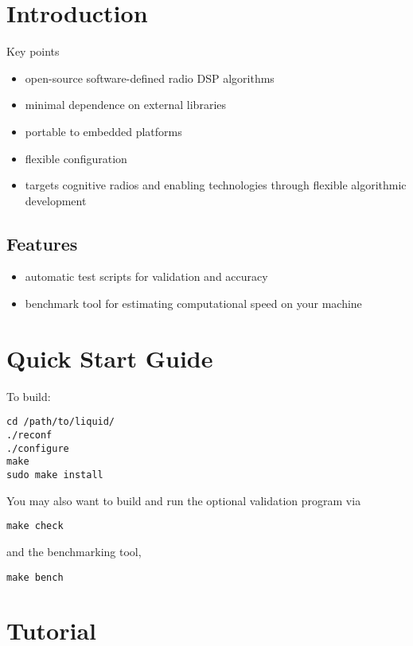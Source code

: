 \documentclass[11pt,twoside]{report}
\begin{document}

%
%

\section{Introduction}
Key points
\begin{itemize}
\item open-source software-defined radio DSP algorithms
\item minimal dependence on external libraries
\item portable to embedded platforms
\item flexible configuration
\item targets cognitive radios and enabling technologies through
      flexible algorithmic development
\end{itemize}

\subsection{Features}
\begin{itemize}
\item automatic test scripts for validation and accuracy
\item benchmark tool for estimating computational speed on your machine
\end{itemize}


\section{Quick Start Guide}
To build:
\begin{verbatim}
cd /path/to/liquid/
./reconf
./configure
make
sudo make install
\end{verbatim}
You may also want to build and run the optional validation program via
\begin{verbatim}
make check
\end{verbatim}
and the benchmarking tool,
\begin{verbatim}
make bench
\end{verbatim}

\section{Tutorial}
\end{document}
